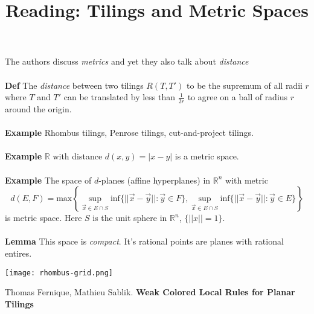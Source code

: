 \documentclass[12pt]{article}
\title{Reading: Tilings and Metric Spaces}
\date{}
\begin{document}
\sffamily

\maketitle

{\fontsize{16pt}{16pt}\selectfont 

\noindent  The authors discuss \textit{metrics} and yet they also talk about \textit{distance} \\ \\
\textbf{Def} The \textit{distance} between two tilings $R(T, T')$ to be the supremum of all radii $r$ where $T$ and $T'$ can be translated by less than $\frac{1}{2r}$ to agree on a ball of radius $r$ around the origin.\\ \\
\textbf{Example} Rhombus tilings, Penrose tilings, cut-and-project tilings. \\ \\
\textbf{Example} $\mathbb{R}$ with distance $d(x,y) = |x-y|$ is a metric space. \\ \\
\textbf{Example} The space of $d$-planes (affine hyperplanes) in $\mathbb{R}^n$ with metric
$$ d(E,F) = \text{max} \left\{ \sup_{\vec{x} \in E \cap S } \text{inf} \{ ||\vec{x}-\vec{y}||: \vec{y} \in F \} , 
\sup_{\vec{x} \in E \cap S } \text{inf} \{ ||\vec{x}-\vec{y}||: \vec{y} \in E \}\right\} $$ 
is metric space.  Here $S$ is the unit sphere in $\mathbb{R}^n$, $\{||x||=1\}$.\\ \\ 
\textbf{Lemma} This space is \textit{compact}.  It's rational points are planes with rational entires. 

\texttt{[image: rhombus-grid.png]}

\vfill

\begin{thebibliography}{}

\item Thomas Fernique, Mathieu Sablik.  \textbf{Weak Colored Local Rules for Planar Tilings}

\end{thebibliography}
}
\end{document}
